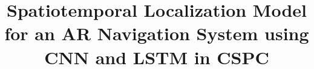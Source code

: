 \documentclass[12pt]{cspcccsthesis}
\title{Spatiotemporal Localization Model for an AR Navigation System using CNN and LSTM in CSPC}
\begin{document}

\begin{frontmatter}
    
    
    
    \makeAbstract
    \makeTOC
    \makeListOfTables
    \makeListOfFigures
\end{frontmatter}

\begin{thesisbody}
    
    
    
    
    
    \makeBibliography
    
    
\end{thesisbody}
\end{document}
